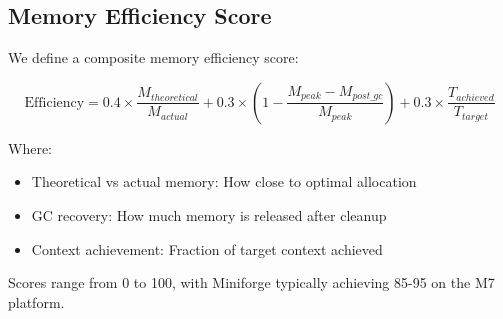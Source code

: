 \subsection{Memory Efficiency Score}

We define a composite memory efficiency score:

\begin{equation}
\text{Efficiency} = 0.4 \times \frac{M_{theoretical}}{M_{actual}} + 0.3 \times \left(1 - \frac{M_{peak} - M_{post\_gc}}{M_{peak}}\right) + 0.3 \times \frac{T_{achieved}}{T_{target}}
\end{equation}

Where:
\begin{itemize}
    \item Theoretical vs actual memory: How close to optimal allocation
    \item GC recovery: How much memory is released after cleanup
    \item Context achievement: Fraction of target context achieved
\end{itemize}

Scores range from 0 to 100, with Miniforge typically achieving 85-95 on the M7 platform.
